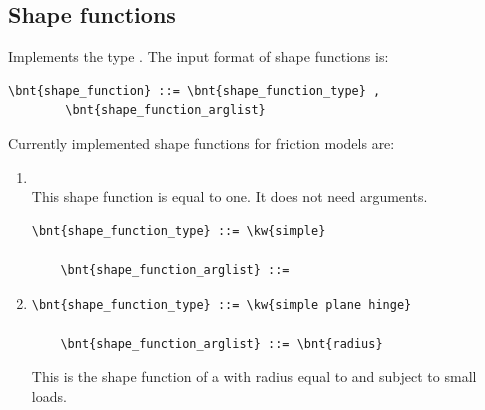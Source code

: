 \subsection{Shape functions}
\label{sec:Shape}
Implements the type .
The input format of shape functions is:
\begin{Verbatim}[commandchars=\\\{\}]
    \bnt{shape_function} ::= \bnt{shape_function_type} ,
        \bnt{shape_function_arglist}
\end{Verbatim}
Currently implemented shape functions for friction models are:
\begin{enumerate}
    \item {}\\
    This shape function is equal to one. It does not need arguments.
\begin{Verbatim}[commandchars=\\\{\}]
    \bnt{shape_function_type} ::= \kw{simple}

    \bnt{shape_function_arglist} ::=
\end{Verbatim}

    \item {}
\begin{Verbatim}[commandchars=\\\{\}]
    \bnt{shape_function_type} ::= \kw{simple plane hinge}

    \bnt{shape_function_arglist} ::= \bnt{radius}
\end{Verbatim}
    This is the shape function of a  with radius equal to 
     and subject to small loads.
\end{enumerate}



